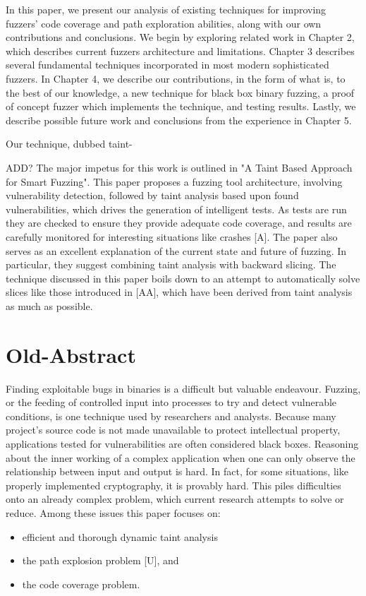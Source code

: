\documentclass[11pt,expanded,copyright]{fsuthesis}
\begin{document}
In this paper, we present our analysis of existing techniques for improving fuzzers' code coverage and path exploration abilities, along with our own contributions and conclusions. We begin by exploring related work in Chapter 2, which describes current fuzzers architecture and limitations. Chapter 3 describes several fundamental techniques incorporated in most modern sophisticated fuzzers. In Chapter 4, we describe our contributions, in the form of what is, to the best of our knowledge, a new technique for black box binary fuzzing, a proof of concept fuzzer which implements the technique, and testing results. Lastly, we describe possible future work and conclusions from the experience in Chapter 5.

Our technique, dubbed taint-

ADD?
The major impetus for this work is outlined in "A Taint Based Approach for Smart Fuzzing". This paper proposes a fuzzing tool architecture, involving vulnerability detection, followed by taint analysis based upon found vulnerabilities, which drives the generation of intelligent tests. As tests are run they are checked to ensure they provide adequate code coverage, and results are carefully monitored for interesting situations like crashes [A]. The paper also serves as an excellent explanation of the current state and future of fuzzing. In particular, they suggest combining taint analysis with backward slicing. The technique discussed in this paper boils down to an attempt to automatically solve slices like those introduced in [AA], which have been derived from taint analysis as much as possible.

\chapter{Old-Abstract}

Finding exploitable bugs in binaries is a difficult but valuable endeavour. Fuzzing, or the feeding of controlled input into processes to try and detect vulnerable conditions, is one technique used by researchers and analysts. Because many project's source code is not made unavailable to protect intellectual property, applications tested for vulnerabilities are often considered black boxes. Reasoning about the inner working of a complex application when one can only observe the relationship between input and output is hard. In fact, for some situations, like properly implemented cryptography, it is provably hard. This piles difficulties onto an already complex problem, which current research attempts to solve or reduce. Among these issues this paper focuses on:
	\begin{itemize}
		\item efficient and thorough dynamic taint analysis
		\item the path explosion problem [U], and
		\item the code coverage problem. 
	\end{itemize}
 
\end{document}
